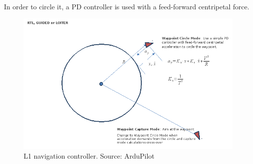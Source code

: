In order to circle it, a PD controller is used with a feed-forward centripetal force.
%
%
\begin{figure}[H]
\centering
  \includegraphics[width=0.8\linewidth]{figs/L1_loiter.png}
  \caption{L1 navigation controller. Source: ArduPilot}
  \label{fig:l1_loop}
\end{figure}
